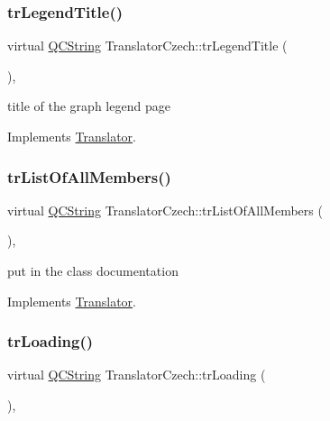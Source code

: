 \subsubsection{\texorpdfstring{trLegendTitle()}{trLegendTitle()}}
{\footnotesize\ttfamily virtual \mbox{\hyperlink{class_q_c_string}{Q\+C\+String}} Translator\+Czech\+::tr\+Legend\+Title (\begin{DoxyParamCaption}{ }\end{DoxyParamCaption})\hspace{0.3cm}{\ttfamily [inline]}, {\ttfamily [virtual]}}

title of the graph legend page 

Implements \mbox{\hyperlink{class_translator}{Translator}}.

\mbox{\label{class_translator_czech_a6506ce7e830bb5b19ec2b0b2b526149a}} 
\subsubsection{\texorpdfstring{trListOfAllMembers()}{trListOfAllMembers()}}
{\footnotesize\ttfamily virtual \mbox{\hyperlink{class_q_c_string}{Q\+C\+String}} Translator\+Czech\+::tr\+List\+Of\+All\+Members (\begin{DoxyParamCaption}{ }\end{DoxyParamCaption})\hspace{0.3cm}{\ttfamily [inline]}, {\ttfamily [virtual]}}

put in the class documentation 

Implements \mbox{\hyperlink{class_translator}{Translator}}.

\mbox{\label{class_translator_czech_a07c7249f8f2d79c3c4b178f10eb09473}} 
\subsubsection{\texorpdfstring{trLoading()}{trLoading()}}
{\footnotesize\ttfamily virtual \mbox{\hyperlink{class_q_c_string}{Q\+C\+String}} Translator\+Czech\+::tr\+Loading (\begin{DoxyParamCaption}{ }\end{DoxyParamCaption})\hspace{0.3cm}{\ttfamily [inline]}, {\ttfamily [virtual]}}

